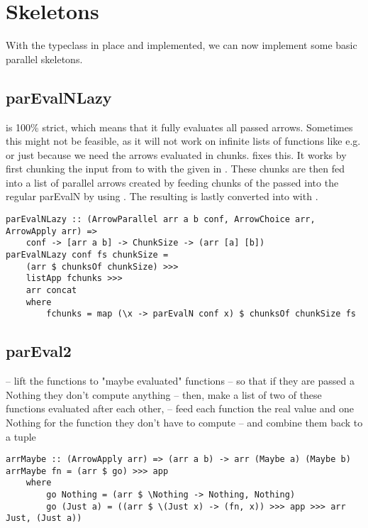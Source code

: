 \section{Skeletons}
With the  typeclass in place and implemented, we can now implement some basic parallel skeletons.

\subsection{parEvalNLazy}
 is 100\% strict, which means that it fully evaluates all passed arrows. Sometimes this might not be feasible, as it will not work on infinite lists of functions like e.g.  or just because we need the arrows evaluated in chunks.  fixes this. It works by first chunking the input from \code{[a]} to \code{[[a]]} with the given  in . These chunks are then fed into a list \code{[arr [a] [b]]} of parallel arrows created by feeding chunks of the passed  into the regular parEvalN by using . The resulting \code{[[b]]} is lastly converted into \code{[b]} with .
\begin{lstlisting}[frame=htrbl]
parEvalNLazy :: (ArrowParallel arr a b conf, ArrowChoice arr, ArrowApply arr) =>
	conf -> [arr a b] -> ChunkSize -> (arr [a] [b])
parEvalNLazy conf fs chunkSize =
	(arr $ chunksOf chunkSize) >>>
	listApp fchunks >>>
	arr concat
	where
		fchunks = map (\x -> parEvalN conf x) $ chunksOf chunkSize fs
\end{lstlisting}

\subsection{parEval2}

-- lift the functions to "maybe evaluated" functions
-- so that if they are passed a Nothing they don't compute anything
-- then, make a list of two of these functions evaluated after each other,
-- feed each function the real value and one Nothing for the function they don't have to compute
-- and combine them back to a tuple

\begin{lstlisting}[frame=htrbl]
arrMaybe :: (ArrowApply arr) => (arr a b) -> arr (Maybe a) (Maybe b)
arrMaybe fn = (arr $ go) >>> app
	where 
		go Nothing = (arr $ \Nothing -> Nothing, Nothing)
		go (Just a) = ((arr $ \(Just x) -> (fn, x)) >>> app >>> arr Just, (Just a))
\end{lstlisting}

